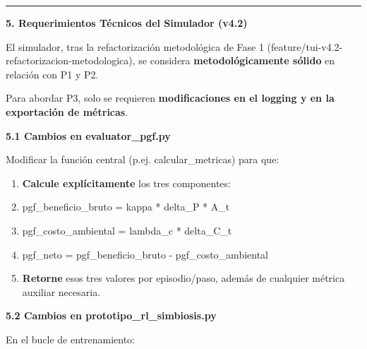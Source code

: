 \begin{center}\rule{0.5\linewidth}{0.5pt}\end{center}

\textbf{5. Requerimientos Técnicos del Simulador (v4.2)}

El simulador, tras la refactorización metodológica de Fase 1
(feature/tui-v4.2-refactorizacion-metodologica), se considera
\textbf{metodológicamente sólido} en relación con P1 y P2.

Para abordar P3, solo se requieren \textbf{modificaciones en el logging
y en la exportación de métricas}.

\textbf{5.1 Cambios en evaluator\_pgf.py}

Modificar la función central (p.ej. calcular\_metricas) para que:

\begin{enumerate}
\def\labelenumi{\arabic{enumi}.}
\item
  \textbf{Calcule explícitamente} los tres componentes:
\item
  pgf\_beneficio\_bruto = kappa * delta\_P * A\_t
\item
  pgf\_costo\_ambiental = lambda\_c * delta\_C\_t
\item
  pgf\_neto = pgf\_beneficio\_bruto - pgf\_costo\_ambiental
\item
  \textbf{Retorne} esos tres valores por episodio/paso, además de
  cualquier métrica auxiliar necesaria.
\end{enumerate}

\textbf{5.2 Cambios en prototipo\_rl\_simbiosis.py}

En el bucle de entrenamiento:

